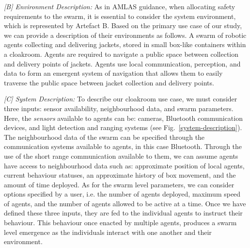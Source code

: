 \documentclass[runningheads]{llncs}
\begin{document}
\emph{[B] Environment Description:}
As in AMLAS guidance, when allocating safety requirements to the swarm, it is essential to consider the system environment, which is represented by Artefact B. 
Based on the primary use case of our study, we can provide a description of their environments as follows. 
A swarm of robotic agents collecting and delivering jackets, stored in small box-like containers within a cloakroom. Agents are required to navigate a public space between collection and delivery points of jackets. Agents use local communication, perception, and data to form an emergent system of navigation that allows them to easily traverse the public space between jacket collection and delivery points.



\emph{[C] System Description:}
To describe our cloakroom use case, we must consider three inputs: sensor availability, neighbourhood data, and swarm parameters. 
Here, the \emph{sensors} available to agents can be: cameras, Bluetooth communication devices, and light detection and ranging systems (see Fig.~\ref{system-description}). 
The neighbourhood data of the swarm can be specified through the communication systems available to agents, in this case Bluetooth. Through the use of the short range communication available to them, we can assume agents have access to neighbourhood data such as: approximate position of local agents, current behaviour statuses, an approximate history of box movement, and the amount of time deployed. 
As for the swarm level parameters, we can consider options specified by a user, i.e. the number of agents deployed, maximum speed of agents, and the number of agents allowed to be active at a time.
Once we have defined these three inputs, they are fed to the individual agents to instruct their behaviour. This behaviour once enacted by multiple agents, produces a swarm level emergence as the individuals interact with one another and their environment.
\end{document}
